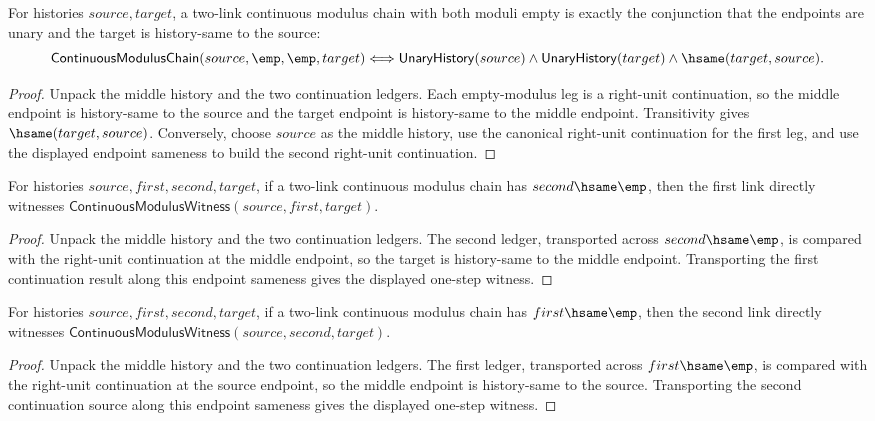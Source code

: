 \begin{theorem}
\label{thm:continuous-modulus-chain-empty-moduli-iff}
For histories $source,target$, a two-link continuous modulus chain with both
moduli empty is exactly the conjunction that the endpoints are unary and the
target is history-same to the source:
$$
\mathsf{ContinuousModulusChain}(source,\emp,\emp,target)
\Longleftrightarrow
\mathsf{UnaryHistory}(source)\land\mathsf{UnaryHistory}(target)\land
\hsame(target,source).
$$
\end{theorem}
\begin{proof}
Unpack the middle history and the two continuation ledgers. Each empty-modulus
leg is a right-unit continuation, so the middle endpoint is history-same to
the source and the target endpoint is history-same to the middle endpoint.
Transitivity gives $\hsame(target,source)$. Conversely, choose $source$ as the
middle history, use the canonical right-unit continuation for the first leg,
and use the displayed endpoint sameness to build the second right-unit
continuation.
\end{proof}

\begin{theorem}
\label{thm:continuous-modulus-chain-empty-second-witness}
For histories $source,first,second,target$, if a two-link continuous modulus
chain has $second\hsame\emp$, then the first link directly witnesses
$\mathsf{ContinuousModulusWitness}(source,first,target)$.
\end{theorem}
\begin{proof}
Unpack the middle history and the two continuation ledgers. The second ledger,
transported across $second\hsame\emp$, is compared with the right-unit
continuation at the middle endpoint, so the target is history-same to the
middle endpoint. Transporting the first continuation result along this
endpoint sameness gives the displayed one-step witness.
\end{proof}

\begin{theorem}
\label{thm:continuous-modulus-chain-empty-first-witness}
For histories $source,first,second,target$, if a two-link continuous modulus
chain has $first\hsame\emp$, then the second link directly witnesses
$\mathsf{ContinuousModulusWitness}(source,second,target)$.
\end{theorem}
\begin{proof}
Unpack the middle history and the two continuation ledgers. The first ledger,
transported across $first\hsame\emp$, is compared with the right-unit
continuation at the source endpoint, so the middle endpoint is history-same to
the source. Transporting the second continuation source along this endpoint
sameness gives the displayed one-step witness.
\end{proof}

